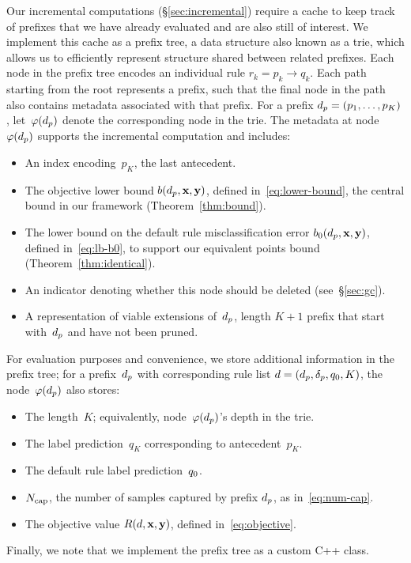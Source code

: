 Our incremental computations (\S\ref{sec:incremental}) require a
cache to keep track of prefixes that we have already evaluated
and are also still of interest.
%
We implement this cache as a prefix tree, a data structure also known as a trie,
which allows us to efficiently represent structure shared between related prefixes.
%
Each node in the prefix tree encodes an individual rule ${r_k = p_k \rightarrow q_k}$.
%
Each path starting from the root represents a prefix, such that the final node
in the path also contains metadata associated with that prefix.
%
For a %
prefix ${d_p = (p_1, \dots, p_K)}$,
let~$\varphi(d_p)$ denote the corresponding node in the trie.
%
The metadata at node~$\varphi(d_p)$ supports the incremental computation
and includes:
\begin{itemize}
\item An index encoding~$p_K$, the last antecedent.
\item The objective lower bound $b(d_p, \mathbf{x}, \mathbf{y})$, defined in~\eqref{eq:lower-bound},
  the central bound in our framework (Theorem~\ref{thm:bound}).
\item The lower bound on the default rule misclassification error
  $b_0(d_p, \mathbf{x}, \mathbf{y})$, defined in~\eqref{eq:lb-b0},
  to support our equivalent points bound (Theorem~\ref{thm:identical}).
\item An indicator denoting whether this node should be deleted (see~\S\ref{sec:gc}).
\item A representation of viable extensions of~$d_p$,
  \ie length ${K+1}$ prefix that start with~$d_p$ and have not been pruned.
\end{itemize}
For evaluation purposes and convenience, we store additional information in
the prefix tree; for a prefix~$d_p$ with corresponding rule list
${{d} = (d_p, \delta_p, q_0, K)}$, the node~$\varphi(d_p)$ also stores:
\begin{itemize}
\item The length~$K$; equivalently, node~$\varphi(d_p)$'s depth in the trie. 
\item The label prediction~$q_K$ corresponding to antecedent~$p_K$.
\item The default rule label prediction~$q_0$.
\item $N_{\textnormal{cap}}$, the number of samples captured by prefix $d_p$, as in~\eqref{eq:num-cap}.
\item The objective value $R({d}, \mathbf{x}, \mathbf{y})$, defined in~\eqref{eq:objective}.
\end{itemize}
%
Finally, we note that we implement the prefix tree as a custom C++ class.

